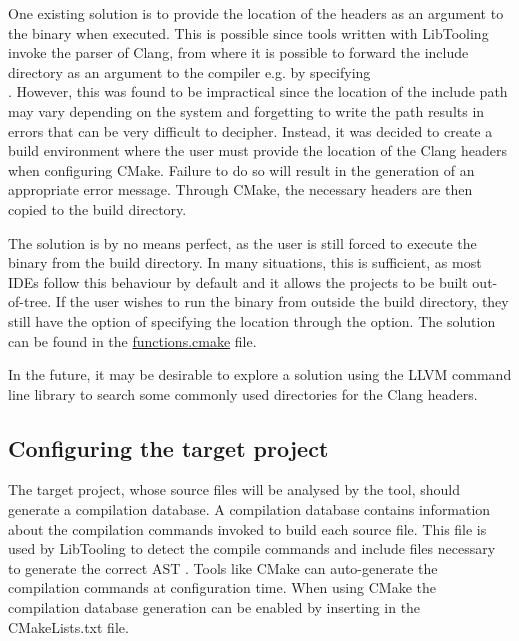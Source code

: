 One existing solution is to provide the location of the headers as an argument to the binary when executed. This is possible since tools written with LibTooling invoke the parser of Clang, from where it is possible to forward the include directory as an argument to the compiler e.g. by specifying\\.
However, this was found to be impractical since the location of the include path may vary depending on the system and forgetting to write the path results in errors that can be very difficult to decipher.
Instead, it was decided to create a build environment where the user must provide the location of the Clang headers when configuring CMake. Failure to do so will result in the generation of an appropriate error message. Through CMake, the necessary headers are then copied to the build directory.

The solution is by no means perfect, as the user is still forced to execute the binary from the build directory. In many situations, this is sufficient, as most IDEs follow this behaviour by default and it allows the projects to be built out-of-tree. If the user wishes to run the binary from outside the build directory, they still have the option of specifying the location through the  option. The solution can be found in the \href{https://github.com/mortenhaahr/RD/blob/main/examples/c_style_array_converter/cmake/functions.cmake}{functions.cmake} file.

In the future, it may be desirable to explore a solution using the LLVM command line library to search some commonly used directories for the Clang headers.

\subsection{Configuring the target project}

The target project, whose source files will be analysed by the tool, should generate a compilation database. A compilation database contains information about the compilation commands invoked to build each source file. This file is used by LibTooling to detect the compile commands and include files necessary to generate the correct AST \cite{clangJSONCompilationDatabase}. Tools like CMake can auto-generate the compilation commands at configuration time. When using CMake the compilation database generation can be enabled by inserting  in the CMakeLists.txt file.